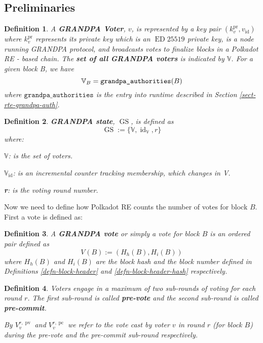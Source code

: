 \documentclass{book}
\newcommand{\assign}{:=}
\newcommand{\nosymbol}{}
\newcommand{\tmop}[1]{\ensuremath{\operatorname{#1}}}
\newcommand{\tmstrong}[1]{\textbf{#1}}
\newcommand{\tmtextbf}[1]{{\bfseries{#1}}}
\newcommand{\tmtexttt}[1]{{\ttfamily{#1}}}
\newcommand{\tmverbatim}[1]{{\ttfamily{#1}}}
\newtheorem{definition}{Definition}
\providecommand{\nosymbol}{}
\providecommand{\tmop}[1]{\ensuremath{\mathrm{#1}}}
\providecommand{\tmstrong}[1]{\tmtextbf{#1}}
\providecommand{\tmtextbf}[1]{\tmtextbf{#1}}
\providecommand{\tmverbatim}[1]{\tmtexttt{#1}}
\newtheorem{definition}{Definition}
\begin{document}
\subsection{Preliminaries}

\begin{definition}
  A {\tmstrong{GRANDPA Voter}}, $v$, is represented by a key pair
  $(k^{\tmop{pr}}_v, v_{\tmop{id}})$ where $k_v^{\tmop{pr}}$ represents its
  private key which is an $\tmop{ED} 25519$ private key, is a node running
  GRANDPA protocol, and broadcasts votes to finalize blocks in a Polkadot RE -
  based chain. The {\tmstrong{set of all GRANDPA voters}} is indicated by
  $\mathbb{V}$. For a given block B, we have {}
  \[ \mathbb{V}_B = \text{\tmverbatim{grandpa\_authorities}} (B) \]
  where $\mathtt{grandpa\_authorities}$ is the entry into runtime described in
  Section \ref{sect-rte-grandpa-auth}.
\end{definition}

\begin{definition}
  {\tmstrong{GRANDPA state}}, $\tmop{GS}$, is defined as {}
  \[ \tmop{GS} \assign \{\mathbb{V}, \tmop{id}_{\mathbb{V}}, r\} \]
  where:
  
  $\mathbb{V}$: is the set of voters.
  
  {\tmstrong{$\mathbb{V}_{\tmop{id}}$}}: is an incremental counter tracking
  \tmverbatim{}membership, which changes in V.
  
  {\tmstrong{r}}: is the votin\tmverbatim{}g round number.
\end{definition}

Now we need to define how Polkadot RE counts the number of votes for block
$B$. First a vote is defined as:

\begin{definition}
  \label{defn-vote}A {\tmstrong{GRANDPA vote }}or simply a vote for block $B$
  is an ordered pair defined as
  \[ V_{\nosymbol} (B) \assign (H_h (B), H_i (B)) \]
  where $H_h (B)$ and $H_i (B)$ are the block hash and the block number
  defined in Definitions \ref{defn-block-header} and
  \ref{defn-block-header-hash} respectively.
\end{definition}

\begin{definition}
  Voters engage in a maximum of two sub-rounds of voting for each round $r$.
  The first sub-round is called {\tmstrong{pre-vote}} and\tmverbatim{} the
  second sub-round is called {\tmstrong{pre-commit}}.
  
  By {\tmstrong{$V_v^{r, \tmop{pv}}$}} and {\tmstrong{$V_v^{r, \tmop{pc}}$}}
  we refer to the vote cast by voter $v$ in round $r$ (for block $B$) during
  the pre-vote and the pre-commit sub-round respectively.
\end{definition}
\end{document}
